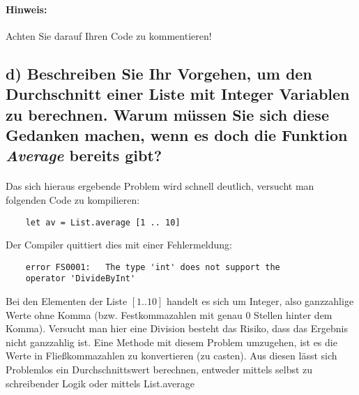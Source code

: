 \paragraph*{Hinweis:}Achten Sie darauf Ihren Code zu kommentieren!

\subsection{d) Beschreiben Sie Ihr Vorgehen, um den Durchschnitt einer Liste mit Integer Variablen zu berechnen. Warum müssen Sie sich diese Gedanken machen, wenn es doch die Funktion \textit{Average} bereits gibt?} 
\paragraph*{}Das sich hieraus ergebende Problem wird schnell deutlich, versucht man folgenden Code zu kompilieren:
\begin{lstlisting}
	let av = List.average [1 .. 10]
\end{lstlisting}
Der Compiler quittiert dies mit einer Fehlermeldung: 
\begin{lstlisting}
	error FS0001:	The type 'int' does not support the
	operator 'DivideByInt'
\end{lstlisting}
Bei den Elementen der Liste $[1 .. 10]$ handelt es sich um Integer, also ganzzahlige Werte ohne Komma (bzw. Festkommazahlen mit genau 0 Stellen hinter dem Komma). Versucht man hier eine Division besteht das Risiko, dass das Ergebnis nicht ganzzahlig ist. Eine Methode mit diesem Problem umzugehen, ist es die Werte in Fließkommazahlen zu konvertieren (zu \glqq casten\grqq). Aus diesen lässt sich Problemlos ein Durchschnittswert berechnen, entweder mittels selbst zu schreibender Logik oder mittels List.average